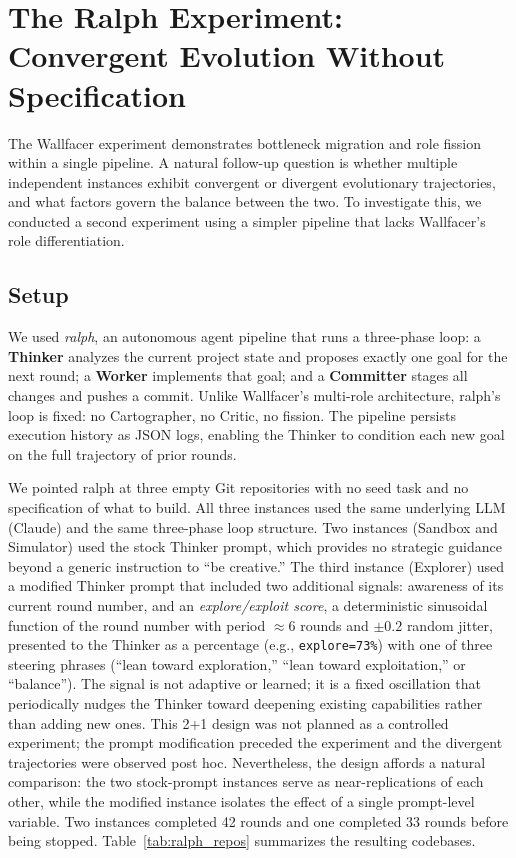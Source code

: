 \section{The Ralph Experiment: Convergent Evolution Without Specification}

The Wallfacer experiment demonstrates bottleneck migration and role fission within a single pipeline. A natural follow-up question is whether multiple independent instances exhibit convergent or divergent evolutionary trajectories, and what factors govern the balance between the two. To investigate this, we conducted a second experiment using a simpler pipeline that lacks Wallfacer's role differentiation.

\subsection{Setup}

We used \emph{ralph}, an autonomous agent pipeline that runs a three-phase loop: a \textbf{Thinker} analyzes the current project state and proposes exactly one goal for the next round; a \textbf{Worker} implements that goal; and a \textbf{Committer} stages all changes and pushes a commit. Unlike Wallfacer's multi-role architecture, ralph's loop is fixed: no Cartographer, no Critic, no fission. The pipeline persists execution history as JSON logs, enabling the Thinker to condition each new goal on the full trajectory of prior rounds.

We pointed ralph at three empty Git repositories with no seed task and no specification of what to build. All three instances used the same underlying LLM (Claude) and the same three-phase loop structure. Two instances (Sandbox and Simulator) used the stock Thinker prompt, which provides no strategic guidance beyond a generic instruction to ``be creative.'' The third instance (Explorer) used a modified Thinker prompt that included two additional signals: awareness of its current round number, and an \emph{explore/exploit score}, a deterministic sinusoidal function of the round number with period ${\approx}6$ rounds and ${\pm}0.2$ random jitter, presented to the Thinker as a percentage (e.g., \texttt{explore=73\%}) with one of three steering phrases (``lean toward exploration,'' ``lean toward exploitation,'' or ``balance''). The signal is not adaptive or learned; it is a fixed oscillation that periodically nudges the Thinker toward deepening existing capabilities rather than adding new ones. This 2+1 design was not planned as a controlled experiment; the prompt modification preceded the experiment and the divergent trajectories were observed post hoc. Nevertheless, the design affords a natural comparison: the two stock-prompt instances serve as near-replications of each other, while the modified instance isolates the effect of a single prompt-level variable. Two instances completed 42 rounds and one completed 33 rounds before being stopped. Table~\ref{tab:ralph_repos} summarizes the resulting codebases.

